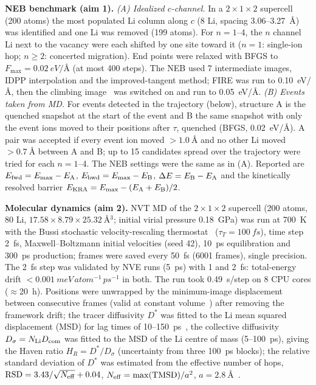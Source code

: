 \documentclass[11pt,a4paper]{article}
\begin{document}
\textbf{NEB benchmark (aim 1).} \textit{(A) Idealized $c$-channel.} In a $2\times1\times2$ supercell (200 atoms) the most populated Li column along $c$ (8 Li, spacing 3.06--\SI{3.27}{\angstrom}) was identified and one Li was removed (199 atoms). For $n=1$--4, the $n$ channel Li next to the vacancy were each shifted by one site toward it ($n=1$: single-ion hop; $n\ge2$: concerted migration). End points were relaxed with BFGS to $F_{\max}=\SI{0.02}{eV/\angstrom}$ (at most 400 steps). The NEB used 7 intermediate images, IDPP interpolation and the improved-tangent method; FIRE was run to \SI{0.10}{eV/\angstrom}, then the climbing image~\cite{Henkelman2000} was switched on and run to \SI{0.05}{eV/\angstrom}. \textit{(B) Events taken from MD.} For events detected in the trajectory (below), structure A is the quenched snapshot at the start of the event and B the same snapshot with only the event ions moved to their positions after $\tau$, quenched (BFGS, \SI{0.02}{eV/\angstrom}). A pair was accepted if every event ion moved $>\SI{1.0}{\angstrom}$ and no other Li moved $>\SI{0.7}{\angstrom}$ between A and B; up to 15 candidates spread over the trajectory were tried for each $n=1$--4. The NEB settings were the same as in (A). Reported are $E_{\rm fwd}=E_{\max}-E_{\rm A}$, $E_{\rm bwd}=E_{\max}-E_{\rm B}$, $\Delta E=E_{\rm B}-E_{\rm A}$ and the kinetically resolved barrier $E_{\rm KRA}=E_{\max}-(E_{\rm A}+E_{\rm B})/2$.

\textbf{Molecular dynamics (aim 2).} NVT MD of the $2\times1\times2$ supercell (200 atoms, 80 Li, $17.58\times8.79\times\SI{25.32}{\angstrom^3}$; initial virial pressure \SI{0.18}{GPa}) was run at \SI{700}{K} with the Bussi stochastic velocity-rescaling thermostat~\cite{Bussi2007} ($\tau_T=\SI{100}{fs}$), time step \SI{2}{fs}, Maxwell--Boltzmann initial velocities (seed 42), \SI{10}{ps} equilibration and \SI{300}{ps} production; frames were saved every \SI{50}{fs} (6001 frames), single precision. The \SI{2}{fs} step was validated by NVE runs (\SI{5}{ps}) with 1 and \SI{2}{fs}: total-energy drift $<\SI{0.001}{meV\,atom^{-1}\,ps^{-1}}$ in both. The run took \SI{0.49}{s/step} on 8 CPU cores ($\approx$\SI{20}{h}). Positions were unwrapped by the minimum-image displacement between consecutive frames (valid at constant volume~\cite{vonBulow2020}) after removing the framework drift; the tracer diffusivity $D^*$ was fitted to the Li mean squared displacement (MSD) for lag times of 10--\SI{150}{ps}~\cite{Rapaport2004}, the collective diffusivity $D_\sigma=N_{\rm Li}D_{\rm com}$ was fitted to the MSD of the Li centre of mass (5--\SI{100}{ps}), giving the Haven ratio $H_R=D^*/D_\sigma$ (uncertainty from three \SI{100}{ps} blocks); the relative standard deviation of $D^*$ was estimated from the effective number of hops, ${\rm RSD}=3.43/\sqrt{N_{\rm eff}}+0.04$, $N_{\rm eff}=\max({\rm TMSD})/a^2$, $a=\SI{2.8}{\angstrom}$~\cite{He2018}.
\end{document}
